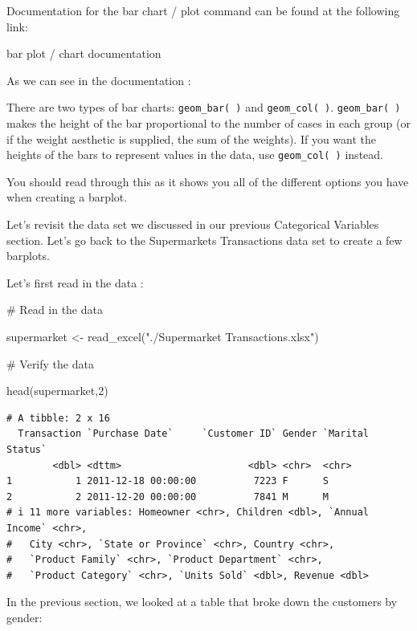 \documentclass[
  letterpaper,
  DIV=11,
  numbers=noendperiod]{scrreprt}
\newenvironment{Shaded}{\begin{snugshade}}{\end{snugshade}}
\newcommand{\CommentTok}[1]{\textcolor[rgb]{0.37,0.37,0.37}{#1}}
\newcommand{\DecValTok}[1]{\textcolor[rgb]{0.68,0.00,0.00}{#1}}
\newcommand{\FunctionTok}[1]{\textcolor[rgb]{0.28,0.35,0.67}{#1}}
\newcommand{\NormalTok}[1]{\textcolor[rgb]{0.00,0.23,0.31}{#1}}
\newcommand{\OtherTok}[1]{\textcolor[rgb]{0.00,0.23,0.31}{#1}}
\newcommand{\StringTok}[1]{\textcolor[rgb]{0.13,0.47,0.30}{#1}}
\begin{document}

Documentation for the bar chart / plot command can be found at the
following link:

bar plot / chart documentation

As we can see in the documentation :

There are two types of bar charts: \texttt{geom\_bar(\ )} and
\texttt{geom\_col(\ )}. \texttt{geom\_bar(\ )} makes the height of the
bar proportional to the number of cases in each group (or if the weight
aesthetic is supplied, the sum of the weights). If you want the heights
of the bars to represent values in the data, use \texttt{geom\_col(\ )}
instead.

You should read through this as it shows you all of the different
options you have when creating a barplot.

Let's revisit the data set we discussed in our previous Categorical
Variables section. Let's go back to the Supermarkets Transactions data
set to create a few barplots.

Let's first read in the data :

\begin{Shaded}
\begin{Highlighting}[]
\CommentTok{\# Read in the data}

\NormalTok{supermarket }\OtherTok{\textless{}{-}} \FunctionTok{read\_excel}\NormalTok{(}\StringTok{"./Supermarket Transactions.xlsx"}\NormalTok{)}

\CommentTok{\# Verify the data}

\FunctionTok{head}\NormalTok{(supermarket,}\DecValTok{2}\NormalTok{)}
\end{Highlighting}
\end{Shaded}

\begin{verbatim}
# A tibble: 2 x 16
  Transaction `Purchase Date`     `Customer ID` Gender `Marital Status`
        <dbl> <dttm>                      <dbl> <chr>  <chr>           
1           1 2011-12-18 00:00:00          7223 F      S               
2           2 2011-12-20 00:00:00          7841 M      M               
# i 11 more variables: Homeowner <chr>, Children <dbl>, `Annual Income` <chr>,
#   City <chr>, `State or Province` <chr>, Country <chr>,
#   `Product Family` <chr>, `Product Department` <chr>,
#   `Product Category` <chr>, `Units Sold` <dbl>, Revenue <dbl>
\end{verbatim}

In the previous section, we looked at a table that broke down the
customers by gender:
\end{document}
